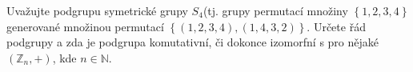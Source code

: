 \subsubsection{}
Uvažujte podgrupu symetrické grupy $S_{4}$(tj. grupy permutací množiny $\left \{
  1,2,3,4 \right \}$
generované množinou permutací $\left \{ \left ( 1,2,3,4 \right ), \left (
1,4,3,2 \right ) \right \}$. Určete řád podgrupy a zda
je podgrupa komutativní, či dokonce izomorfní s pro nějaké $(\mathbb{Z}_{n}, +)$, kde
$n \in \mathbb{N}$.

